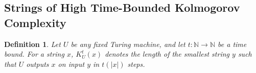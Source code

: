 \documentclass[11pt]{article}
\newtheorem{theorem}{Theorem}
\newtheorem{definition}{Definition}
\begin{document}



\subsection{Strings of High Time-Bounded Kolmogorov Complexity}

\begin{definition}
Let $U$ be any fixed Turing machine, and let $t: \mathbb{N} \rightarrow \mathbb{N}$ be a time bound. For a string $x$, $K_U^t(x)$ denotes the length of the smallest string $y$ such that $U$ outputs $x$ on input $y$ in $t(|x|)$ steps. 
\end{definition}
\end{document}

